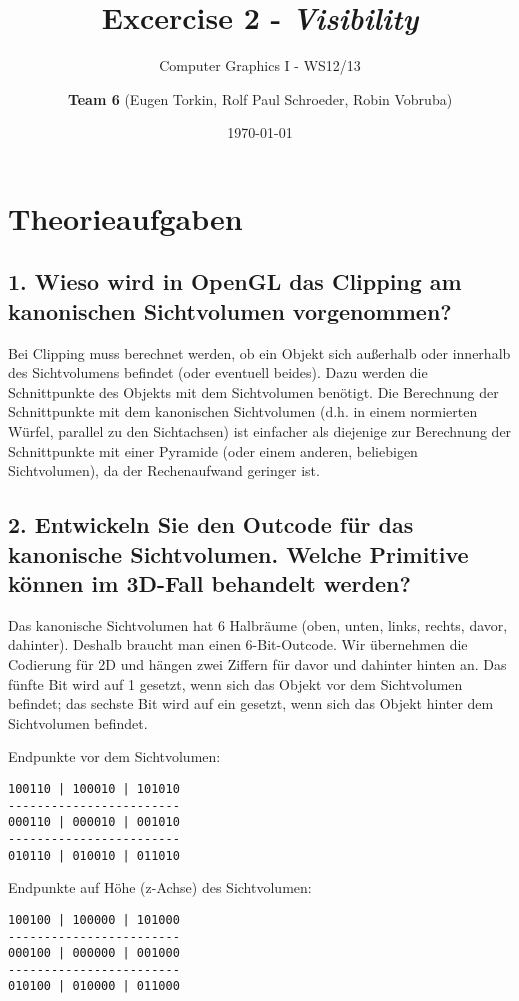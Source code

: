 \documentclass[a4paper,headings=small]{scrartcl}
\title{Excercise 2 - \emph{Visibility}}
\subtitle{Computer Graphics I - WS12/13}
\author{\textbf{Team 6} (Eugen Torkin, Rolf Paul Schroeder, Robin Vobruba)}
\date{\today}
\numberwithin{equation}{section} %
\numberwithin{figure}{section}   %
\begin{document}
\maketitle


\section{Theorieaufgaben}

\subsection{1. Wieso wird in OpenGL das Clipping am kanonischen Sichtvolumen vorgenommen?}

Bei Clipping muss berechnet werden, ob ein Objekt sich außerhalb oder innerhalb des Sichtvolumens befindet (oder eventuell beides). Dazu werden die Schnittpunkte des Objekts mit dem Sichtvolumen benötigt. Die Berechnung der Schnittpunkte mit dem kanonischen Sichtvolumen (d.h. in einem normierten Würfel, parallel zu den Sichtachsen) ist einfacher als diejenige zur Berechnung der Schnittpunkte mit einer Pyramide (oder einem anderen, beliebigen Sichtvolumen), da der Rechenaufwand geringer ist.

\subsection{2. Entwickeln Sie den Outcode für das kanonische Sichtvolumen. Welche Primitive können im 3D-Fall behandelt werden?}

Das kanonische Sichtvolumen hat 6 Halbräume (oben, unten, links, rechts, davor, dahinter). Deshalb braucht man einen 6-Bit-Outcode. Wir übernehmen die Codierung für 2D und hängen zwei Ziffern für davor und dahinter hinten an. Das fünfte Bit wird auf 1 gesetzt, wenn sich das Objekt vor dem Sichtvolumen befindet; das sechste Bit wird auf ein gesetzt, wenn sich das Objekt hinter dem Sichtvolumen befindet.

Endpunkte vor dem Sichtvolumen:
\begin{verbatim}
100110 | 100010 | 101010
------------------------
000110 | 000010 | 001010
------------------------
010110 | 010010 | 011010
\end{verbatim}

Endpunkte auf Höhe (z-Achse) des Sichtvolumen:
\begin{verbatim}
100100 | 100000 | 101000
------------------------
000100 | 000000 | 001000
------------------------
010100 | 010000 | 011000
\end{verbatim}
\end{document}
